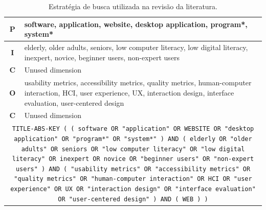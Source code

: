 \begin{table}[H]
\centering
\begin{tabular}{|c|p{11cm}|}
\hline
\textbf{P} & software, application, website, desktop application, program*, system* \\ \hline
\textbf{I} & elderly, older adults, seniors, low computer literacy, low digital literacy, inexpert, novice, beginner users, non-expert users \\ \hline
\textbf{C} & Unused dimension \\ \hline
\textbf{O} & usability metrics, accessibility metrics, quality metrics, human-computer interaction, HCI, user experience, UX, interaction design, interface evaluation, user-centered design \\ \hline
\textbf{C} & Unused dimension \\ \hline
\multicolumn{2}{|c|}{\begin{minipage}{15cm}
\centering
\texttt{TITLE-ABS-KEY ( ( software OR "application" OR WEBSITE OR "desktop application" OR "program*" OR "system*" ) AND ( elderly OR "older adults" OR seniors OR "low computer literacy" OR "low digital literacy" OR inexpert OR novice OR "beginner users" OR "non-expert users" ) AND ( "usability metrics" OR "accessibility metrics" OR "quality metrics" OR "human-computer interaction" OR HCI OR "user experience" OR UX OR "interaction design" OR "interface evaluation" OR "user-centered design" ) AND ( WEB ) )}
\end{minipage}} \\ \hline
\end{tabular}
\caption{Estratégia de busca utilizada na revisão da literatura.}
\label{tab:searchstring}
\end{table}